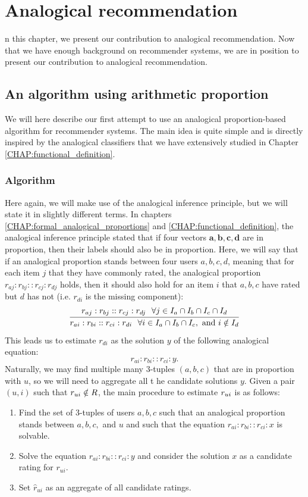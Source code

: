\chapter{Analogical recommendation}
\label{CHAP:analogical_recommendation}

n this chapter, we present our contribution to analogical
recommendation. Now that we have enough background on recommender systems, we
are in position to present our contribution to analogical recommendation.  

\section{An algorithm using arithmetic proportion}
\label{SEC:analogical_reco_basic_algo}
We will here describe our first attempt to use an analogical proportion-based
algorithm for recommender systems. The main idea is quite simple and is
directly inspired by the analogical classifiers that we have extensively
studied in Chapter \ref{CHAP:functional_definition}.
\subsection{Algorithm}

Here again, we will make use of the analogical inference principle, but we will
state it in slightly different terms. In chapters
\ref{CHAP:formal_analogical_proportions} and \ref{CHAP:functional_definition},
the analogical inference principle stated that if four vectors $\mathbf{a},
\mathbf{b}, \mathbf{c}, \mathbf{d}$ are in proportion, then their labels should
also be in proportion.  Here, we will say that if an analogical proportion
stands between four users $a, b, c, d$, meaning that for each item $j$ that
they have commonly rated, the analogical proportion $r_{aj} : r_{bj} :: r_{cj}
: r_{dj}$ holds, then it should also hold for an item $i$ that $a, b, c$ have
rated but $d$ has not (i.e. $r_{di}$ is the missing component):
$$
\infer{
r_{ai} : r_{bi} :: r_{ci} : r_{di} ~~ \forall i \in I_a \cap I_b \cap I_c,
\text{ and } i\notin I_d }{r_{aj} : r_{bj} :: r_{cj} : r_{dj} ~~ \forall j \in
I_a \cap I_b \cap I_c \cap  I_d}
$$
This leads us to estimate $r_{di}$ as the solution $y$ of the following
analogical equation:
$$r_{ai} : r_{bi} :: r_{ci} : y.$$
Naturally, we may find multiple many $3$-tuples $(a, b, c)$ that are in proportion with
$u$, so we will need  to aggregate all t he candidate solutions $y$.  Given a
pair $(u,i)$ such that $r_{ui} \notin R$, the main procedure to estimate $r_{ui}$
is as follows:
\begin{enumerate}
\item Find the set of 3-tuples of users $a, b, c$ such that an analogical
  proportion stands between $a, b, c,$ and $u$ and such that the equation
    $r_{ai} : r_{bi} :: r_{ci} : x$ is solvable.
\item Solve the equation $r_{ai} : r_{bi} :: r_{ci} : y$ and consider the
  solution $x$ as a candidate rating for $r_{ui}$.
\item Set $\hat{r}_{ui}$ as an aggregate of all candidate ratings.
\end{enumerate}

